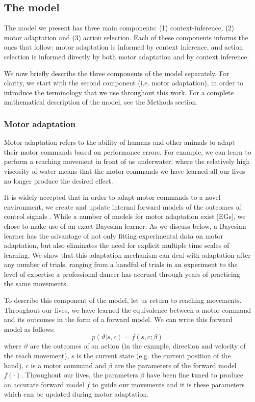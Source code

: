 \documentclass[a4paper,doc,floatsintext,natbib]{apa6}
\begin{document}
\subsection{The model}
The model we present has three main components: (1) context-inference, (2) motor adaptation and (3) action selection. Each of these components informs the ones that follow: motor adaptation is informed by context inference, and action selection is informed directly by both motor adaptation and by context inference.

We now briefly describe the three components of the model separately. For clarity, we start with the second component (i.e. motor adaptation), in order to introduce the terminology that we use throughout this work. For a complete mathematical description of the model, see the Methods section.

\subsubsection{Motor adaptation}
Motor adaptation refers to the ability of humans and other animals to adapt their motor commands based on performance errors. For example, we can learn to perform a reaching movement in front of us underwater, where the relatively high viscosity of water means that the motor commands we have learned all our lives no longer produce the desired effect.

It is widely accepted that in order to adapt motor commands to a novel environment, we create and update internal forward models of the outcomes of control signals \cite{Wolpert_Multiple_1998a} . While a number of models for motor adaptation exist [EGs], we chose to make use of an exact Bayesian learner. As we discuss below, a Bayesian learner has the advantage of not only fitting experimental data on motor adaptation, but also eliminates the need for explicit multiple time scales of learning. We show that this adaptation mechanism can deal with adaptation after any number of trials, ranging from a handful of trials in an experiment to the level of expertise a professional dancer has accrued through years of practicing the same movements.

To describe this component of the model, let us return to reaching movements. Throughout our lives, we have learned the equivalence between a motor command and its outcomes in the form of a forward model. We can write this forward model as follows:
\begin{equation}
p(\vartheta | s, c) = f(s, c; \beta)
\end{equation}
where $\vartheta$ are the outcomes of an action (in the example, direction and velocity of the reach movement), $s$ is the current state (e.g. the current position of the hand), $c$ is a motor command and $\beta$ are the parameters of the forward model $f(\cdot)$. Throughout our lives, the parameters $\beta$ have been fine tuned to produce an accurate forward model $f$ to guide our movements and it is these parameters which can be updated during motor adaptation.
\end{document}
